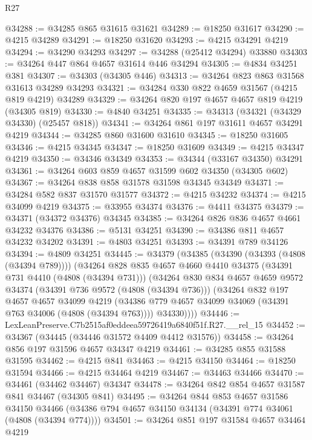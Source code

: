 \begin{lexlean}{R27}
\begin{coremodule}
@34288 := @34285 @865 @31615 @31621
@34289 := @18250 @31617
@34290 := @4215 @34289
@34291 := @18250 @31620
@34293 := @4215 @34291 @4219
@34294 := @34290 @34293
@34297 := @34288 (@25412 @34294) @33880
@34303 := @34264 @447 @864 @4657 @31614 @446 @34294
@34305 := @4834 @34251 @381
@34307 := @34303 (@34305 @446)
@34313 := @34264 @823 @863 @31568 @31613 @34289 @34293
@34321 := @34284 @330 @822 @4659 @31567 (@4215 @819 @4219) @34289
@34329 := @34264 @820 @197 @4657 @4657 @819 @4219 (@34305 @819)
@34330 := @4840 @34251
@34335 := @34313 (@34321 (@34329 @34330) (@25457 @818))
@34341 := @34264 @861 @197 @31611 @4657 @34291 @4219
@34344 := @34285 @860 @31600 @31610
@34345 := @18250 @31605
@34346 := @4215 @34345
@34347 := @18250 @31609
@34349 := @4215 @34347 @4219
@34350 := @34346 @34349
@34353 := @34344 (@33167 @34350) @34291
@34361 := @34264 @603 @859 @4657 @31599 @602 @34350 (@34305 @602)
@34367 := @34264 @838 @858 @31578 @31598 @34345 @34349
@34371 := @34284 @582 @837 @31570 @31577
@34372 := @4215 @34232
@34374 := @4215 @34099 @4219
@34375 := @33955 @34374
@34376 := @4411 @34375
@34379 := @34371 (@34372 @34376) @34345
@34385 := @34264 @826 @836 @4657 @4661 @34232 @34376
@34386 := @5131 @34251
@34390 := @34386 @811 @4657 @34232 @34202
@34391 := @4803 @34251
@34393 := @34391 @789 @34126
@34394 := @4809 @34251
@34445 := @34379
    (@34385
      (@34390 (@34393 (@4808 (@34394 @789))))
      (@34264
        @828
        @835
        @4657
        @4660
        @4410
        @34375
        (@34391 @731 @4410 (@4808 (@34394 @731)))
        (@34264
          @830
          @834
          @4657
          @4659
          @9572
          @34374
          (@34391 @736 @9572 (@4808 (@34394 @736)))
          (@34264
            @832
            @197
            @4657
            @4657
            @34099
            @4219
            (@34386 @779 @4657 @34099 @34069 (@34391 @763 @34006 (@4808 (@34394 @763))))
            @34330))))
@34446 := LexLeanPreserve.C7b2515af0eddeea59726419a6840f51f.R27.__rel_15
@34452 := @34367 (@34445 (@34446 @31572 @4409 @4412 @31576))
@34458 := @34264 @856 @197 @31596 @4657 @34347 @4219
@34461 := @34285 @855 @31588 @31595
@34462 := @4215 @841
@34463 := @4215 @34150
@34464 := @18250 @31594
@34466 := @4215 @34464 @4219
@34467 := @34463 @34466
@34470 := @34461 (@34462 @34467) @34347
@34478 := @34264 @842 @854 @4657 @31587 @841 @34467 (@34305 @841)
@34495 := @34264
    @844
    @853
    @4657
    @31586
    @34150
    @34466
    (@34386 @794 @4657 @34150 @34134 (@34391 @774 @34061 (@4808 (@34394 @774))))
@34501 := @34264 @851 @197 @31584 @4657 @34464 @4219

\end{coremodule}
\end{lexlean}
